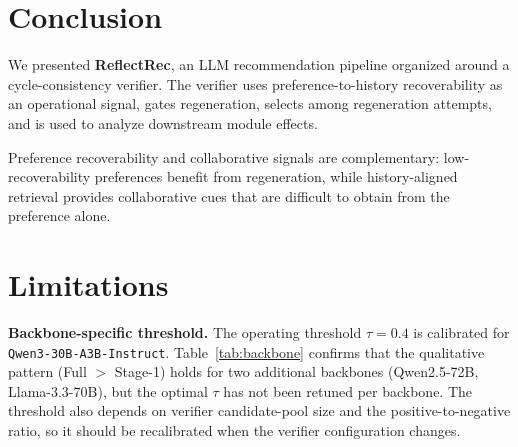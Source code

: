 \documentclass[11pt]{article}
\begin{document}
\section{Conclusion}
\label{sec:conclusion}

We presented \textbf{ReflectRec}, an LLM recommendation pipeline organized around a cycle-consistency verifier. The verifier uses preference-to-history recoverability as an operational signal, gates regeneration, selects among regeneration attempts, and is used to analyze downstream module effects.

Preference recoverability and collaborative signals are complementary: low-recoverability preferences benefit from regeneration, while history-aligned retrieval provides collaborative cues that are difficult to obtain from the preference alone.




\section*{Limitations}
\textbf{Backbone-specific threshold.} The operating threshold $\tau{=}0.4$ is calibrated for \texttt{Qwen3-30B-A3B-Instruct}. Table~\ref{tab:backbone} confirms that the qualitative pattern (Full $>$ Stage-1) holds for two additional backbones (Qwen2.5-72B, Llama-3.3-70B), but the optimal $\tau$ has not been retuned per backbone. The threshold also depends on verifier candidate-pool size and the positive-to-negative ratio, so it should be recalibrated when the verifier configuration changes.
\end{document}

